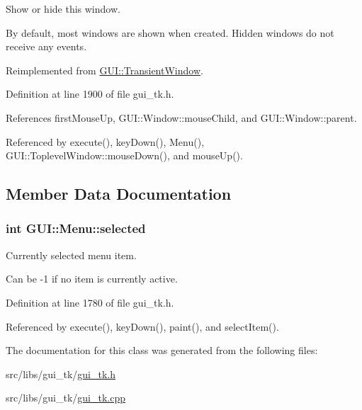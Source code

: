 Show or hide this window. 

By default, most windows are shown when created. Hidden windows do not receive any events. 

Reimplemented from \hyperlink{classGUI_1_1TransientWindow_a5581ee490ae2ce490ca45e234f6712a2}{G\-U\-I\-::\-Transient\-Window}.



Definition at line 1900 of file gui\-\_\-tk.\-h.



References first\-Mouse\-Up, G\-U\-I\-::\-Window\-::mouse\-Child, and G\-U\-I\-::\-Window\-::parent.



Referenced by execute(), key\-Down(), Menu(), G\-U\-I\-::\-Toplevel\-Window\-::mouse\-Down(), and mouse\-Up().



\subsection{Member Data Documentation}
\hypertarget{classGUI_1_1Menu_a6934c1ce59c87dc59630390e8fb37e1a}{
\subsubsection[{selected}]{\setlength{\rightskip}{0pt plus 5cm}int {\bf G\-U\-I\-::\-Menu\-::selected}}}\label{classGUI_1_1Menu_a6934c1ce59c87dc59630390e8fb37e1a}


Currently selected menu item. 

Can be -\/1 if no item is currently active. 

Definition at line 1780 of file gui\-\_\-tk.\-h.



Referenced by execute(), key\-Down(), paint(), and select\-Item().



The documentation for this class was generated from the following files\-:\begin{DoxyCompactItemize}
\item 
src/libs/gui\-\_\-tk/\hyperlink{gui__tk_8h}{gui\-\_\-tk.\-h}\item 
src/libs/gui\-\_\-tk/\hyperlink{gui__tk_8cpp}{gui\-\_\-tk.\-cpp}\end{DoxyCompactItemize}
